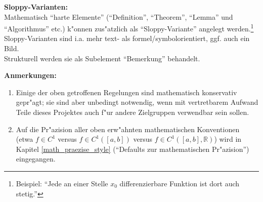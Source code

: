 \begin{list_sabina}

\clearpage

\item
\textbf{Sloppy-Varianten:}\\
Mathematisch ``harte Elemente'' (``Definition'', ``Theorem'',
``Lemma'' und ``Algorithmus'' etc.) k"onnen zus"atzlich als
``Sloppy-Variante'' angelegt werden.\footnote{Beispiel: ``Jede an einer
Stelle $x_0$ differenzierbare Funktion ist dort auch stetig.''}
Sloppy-Varianten sind i.a. mehr text- als formel/symbolorientiert, ggf.
auch ein Bild.\\
Strukturell werden sie als Subelement ``Bemerkung'' behandelt.

\end{list_sabina}


\vspace{30mm}


\textbf{Anmerkungen:}


\begin{enumerate}

\item
Einige der oben getroffenen Regelungen sind mathematisch konservativ
gepr"agt; sie sind aber unbedingt notwendig, wenn mit vertretbarem
Aufwand Teile dieses Projektes auch f"ur andere Zielgruppen verwendbar
sein sollen.

\item
Auf die Pr"azision aller oben erw"ahnten mathematischen Konventionen\\
(etwa $f\in C^1$ versus $f\in C^1([a,b])$ versus $f \in C^{1}([a,b],\mathbb{R})$)
wird in Kapitel \ref{math_praezise_style} (``Defaults zur mathematischen Pr"azision'')
eingegangen.


\end{enumerate}




















